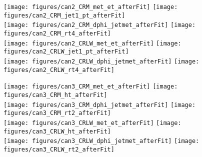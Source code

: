 \begin{figure}[ph!]
  \begin{center}
    \texttt{[image: figures/can2\_CRM\_met\_et\_afterFit]}
    \texttt{[image: figures/can2\_CRM\_jet1\_pt\_afterFit]} \\
    \texttt{[image: figures/can2\_CRM\_dphi\_jetmet\_afterFit]}
    \texttt{[image: figures/can2\_CRM\_rt4\_afterFit]} \\
    \texttt{[image: figures/can2\_CRLW\_met\_et\_afterFit]}
    \texttt{[image: figures/can2\_CRLW\_jet1\_pt\_afterFit]} \\
    \texttt{[image: figures/can2\_CRLW\_dphi\_jetmet\_afterFit]}
    \texttt{[image: figures/can2\_CRLW\_rt4\_afterFit]} \\
    \label{fig:bkgfit_CR2_after}
  \end{center}
\end{figure}

 \begin{figure}[ph!]
  \begin{center}
    \texttt{[image: figures/can3\_CRM\_met\_et\_afterFit]}
    \texttt{[image: figures/can3\_CRM\_ht\_afterFit]} \\
    \texttt{[image: figures/can3\_CRM\_dphi\_jetmet\_afterFit]}
    \texttt{[image: figures/can3\_CRM\_rt2\_afterFit]} \\
    \texttt{[image: figures/can3\_CRLW\_met\_et\_afterFit]}
    \texttt{[image: figures/can3\_CRLW\_ht\_afterFit]} \\
    \texttt{[image: figures/can3\_CRLW\_dphi\_jetmet\_afterFit]}
    \texttt{[image: figures/can3\_CRLW\_rt2\_afterFit]} \\
    \label{fig:bkgfit_CR3_after}
  \end{center}
\end{figure}

